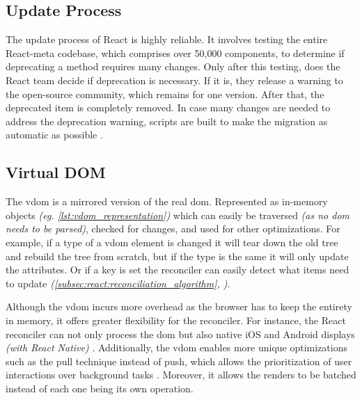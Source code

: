 



\subsection{Update Process}
\label{subsec:react:update_process}

The update process of React is highly reliable. It involves testing the entire React-meta codebase, which comprises over 50,000 components, to determine if deprecating a method requires many changes. Only after this testing, does the React team decide if deprecation is necessary. If it is, they release a warning to the open-source community, which remains for one version. After that, the deprecated item is completely removed. In case many changes are needed to address the deprecation warning, scripts are built to make the migration as automatic as possible \cite{react:design_principles}.

\subsection{Virtual DOM}
\label{subsec:vdom}

The \acrfull{vdom} is a mirrored version of the real \acrshort{dom}. Represented as in-memory objects \textit{(eg. \autoref{lst:vdom_representation})} which can easily be traversed \textit{(as no \acrshort{dom} needs to be parsed)}, checked for changes, and used for other optimizations. For example, if a type of a \acrshort{vdom} element is changed it will tear down the old tree and rebuild the tree from scratch, but if the type is the same it will only update the attributes. Or if a key is set the reconciler can easily detect what items need to update  \textit{(\ref{subsec:react:reconciliation_algorithm}, \cite{react:reconciliation, acdlite:react_fiber_architecture})}.

Although the \acrshort{vdom} incurs more overhead as the browser has to keep the entirety in memory, it offers greater flexibility for the reconciler. For instance, the React reconciler can not only process the \acrshort{dom} but also native iOS and Android displays \textit{(with React Native)} \cite{acdlite:react_fiber_architecture}. Additionally, the \acrshort{vdom} enables more unique optimizations such as the pull technique instead of push, which allows the prioritization of user interactions over background tasks \cite{react:design_principles}. Moreover, it allows the renders to be batched instead of each one being its own operation.


